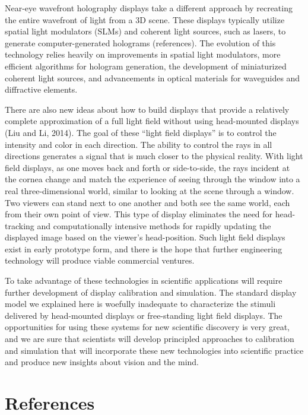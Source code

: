 \documentclass[
  letterpaper,
]{book}
\begin{document}
Near-eye wavefront holography displays take a different approach by
recreating the entire wavefront of light from a 3D scene. These displays
typically utilize spatial light modulators (SLMs) and coherent light
sources, such as lasers, to generate computer-generated holograms
(references). The evolution of this technology relies heavily on
improvements in spatial light modulators, more efficient algorithms for
hologram generation, the development of miniaturized coherent light
sources, and advancements in optical materials for waveguides and
diffractive elements.

There are also new ideas about how to build displays that provide a
relatively complete approximation of a full light field without using
head-mounted displays (Liu and Li, 2014). The goal of these ``light
field displays'' is to control the intensity and color in each
direction. The ability to control the rays in all directions generates a
signal that is much closer to the physical reality. With light field
displays, as one moves back and forth or side-to-side, the rays incident
at the cornea change and match the experience of seeing through the
window into a real three-dimensional world, similar to looking at the
scene through a window. Two viewers can stand next to one another and
both see the same world, each from their own point of view. This type of
display eliminates the need for head-tracking and computationally
intensive methods for rapidly updating the displayed image based on the
viewer's head-position. Such light field displays exist in early
prototype form, and there is the hope that further engineering
technology will produce viable commercial ventures.

To take advantage of these technologies in scientific applications will
require further development of display calibration and simulation. The
standard display model we explained here is woefully inadequate to
characterize the stimuli delivered by head-mounted displays or
free-standing light field displays. The opportunities for using these
systems for new scientific discovery is very great, and we are sure that
scientists will develop principled approaches to calibration and
simulation that will incorporate these new technologies into scientific
practice and produce new insights about vision and the mind.

\section{References}\label{references}
\end{document}
